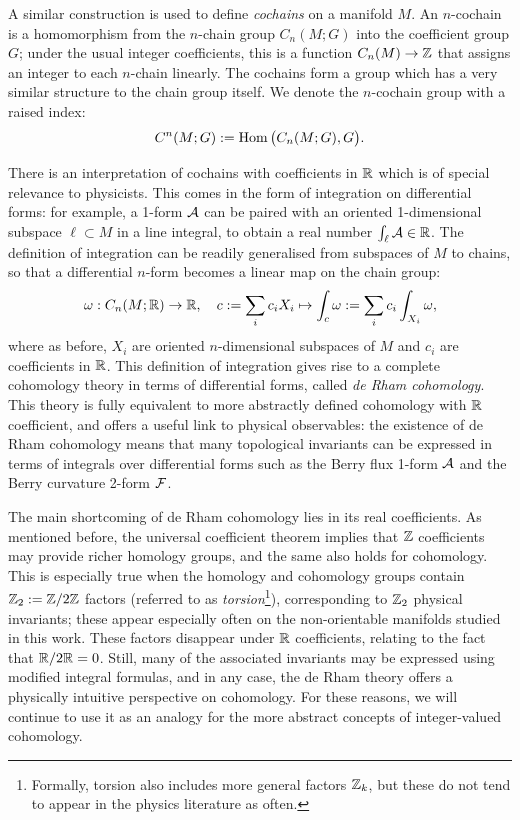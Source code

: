 A similar construction is used to define \emph{cochains} on a manifold $M$. An $n$-cochain is a homomorphism from the $n$-chain group $C_n(M;G)$ into the coefficient group $G$; under the usual integer coefficients, this is a function $C_n(M)\to\mathbb{Z}$ that assigns an integer to each $n$-chain linearly. The cochains form a group which has a very similar structure to the chain group itself. We denote the $n$-cochain group with a raised index:
\begin{equation*}
	C^n(M;G) := \operatorname{Hom}\big(C_n(M;G),G\big).
\end{equation*}

There is an interpretation of cochains with coefficients in $\mathbb{R}$ which is of special relevance to physicists. This comes in the form of integration on differential forms: for example, a 1-form $\mathcal{A}$ can be paired with an oriented 1-dimensional subspace $\ell\subset M$ in a line integral, to obtain a real number $\int_{\ell}\mathcal{A}\in\mathbb{R}$. The definition of integration can be readily generalised from subspaces of $M$ to chains, so that a differential $n$-form becomes a linear map on the chain group:
\begin{equation*}
	\omega: C_n(M;\mathbb{R})\to\mathbb{R},\quad c := \sum_i c_i X_i \mapsto \int_c \omega := \sum_i c_i \int_{X_i}\omega,
\end{equation*}
where as before, $X_i$ are oriented $n$-dimensional subspaces of $M$ and $c_i$ are coefficients in $\mathbb{R}$. This definition of integration gives rise to a complete cohomology theory in terms of differential forms, called \emph{de Rham cohomology}. This theory is fully equivalent to more abstractly defined cohomology with $\mathbb{R}$ coefficient, and offers a useful link to physical observables: the existence of de Rham cohomology means that many topological invariants can be expressed in terms of integrals over differential forms such as the Berry flux 1-form $\mathcal{A}$ and the Berry curvature 2-form $\mathcal{F}$.

The main shortcoming of de Rham cohomology lies in its real coefficients. As mentioned before, the universal coefficient theorem implies that $\mathbb{Z}$ coefficients may provide richer homology groups, and the same also holds for cohomology. This is especially true when the homology and cohomology groups contain $\mathbb{Z}_2 := \mathbb{Z}/2\mathbb{Z}$ factors (referred to as \emph{torsion}\footnote{
	Formally, torsion also includes more general factors $\mathbb{Z}_k$, but these do not tend to appear in the physics literature as often.}),
corresponding to $\mathbb{Z}_2$ physical invariants; these appear especially often on the non-orientable manifolds studied in this work. These factors disappear under $\mathbb{R}$ coefficients, relating to the fact that $\mathbb{R}/2\mathbb{R} = 0$. Still, many of the associated invariants may be expressed using modified integral formulas, and in any case, the de Rham theory offers a physically intuitive perspective on cohomology. For these reasons, we will continue to use it as an analogy for the more abstract concepts of integer-valued cohomology.

